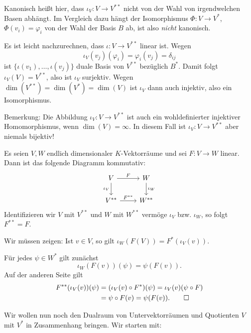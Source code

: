Kanonisch heißt hier, dass $\iota_V \colon V \rightarrow V^{**}$ nicht von der Wahl von irgendwelchen Basen abhängt.
Im Vergleich dazu hängt der Isomorphismus $\Phi\colon V \rightarrow V^*$, $\Phi(v_i) = \varphi_i$ von der Wahl der Basis $B$ ab, ist also \textit{nicht} kanonisch. 

\begin{beweis}
	Es ist leicht nachzurechnen, dass $\iota\colon V \rightarrow V^{**}$ linear ist.
	Wegen
	\[
		\iota_V(v_j)(\varphi_i) = \varphi_i(v_j) = \delta_{ij}
	\]
	ist $\{\iota(v_1),\dots,\iota(v_j)\}$ duale Basis von $V^{**}$ bezüglich $B^*$.
	Damit folgt $\iota_V(V) = V^{**}$, also ist $\iota_V$ surjektiv.
	Wegen $\dim(V^{**}) = \dim(V^*) = \dim(V)$ ist $\iota_V$ dann auch injektiv, also ein Isomorphismus. \qedhere
\end{beweis}

Bemerkung: Die Abbildung $\iota_V \colon V \rightarrow V^{**}$ ist auch ein wohldefinierter injektiver Homomorphismus, wenn $\dim(V) = \infty$.
In diesem Fall ist $\iota_V \colon V \rightarrow V^{**}$ aber niemals bijektiv!

\begin{satz}
	\label{satz:12.12}
	Es seien $V,W$ endlich dimensionaler $K$-Vektorräume und sei $F \colon V \rightarrow W$ linear.
	Dann ist das folgende Diagramm kommutativ:
	\[
		\begin{tikzcd}
			V \arrow[r,"F"] \arrow[d,"\iota_V"'] & W \arrow[d,"\iota_W"] \\
			V^{**} \arrow[r,"F^{**}"] & W^{**}
		\end{tikzcd}
	\]
	Identifizieren wir $V$ mit $V^{**}$ und $W$ mit $W^{**}$ vermöge $\iota_V$ bzw. $\iota_W$, so folgt $F^{**} = F$.
\end{satz}

\begin{beweis}
	Wir müssen zeigen:
	Ist $v \in V$, so gilt $\iota_W(F(V)) = F^*(\iota_V(v))$.
	
	Für jedes $\psi \in W^*$ gilt zunächst
	\[
		\iota_W(F(v))(\psi) = \psi(F(v)).
	\]
	Auf der anderen Seite gilt
	\begin{align*}
		F^{**}(\iota_V(v))(\psi) &= (\iota_V(v) \circ F^*)(\psi) = \iota_V(v)(\psi \circ F) \\
		&= \psi \circ F(v) = \psi(F(v)). \qedhere
	\end{align*}
\end{beweis}

Wir wollen nun noch den Dualraum von Untervektorräumen und Quotienten $V$ mit $V^*$ in Zusammenhang bringen.
Wir starten mit:

